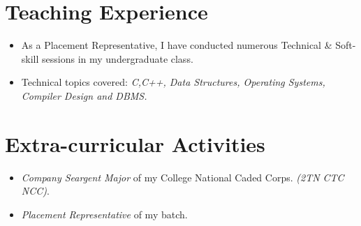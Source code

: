 \documentclass{resume}
\begin{document}
\section{Teaching Experience}
  \begin{itemize}[label={$\ast$}]
    \item As a Placement Representative, I have conducted numerous Technical \& Soft-skill sessions in my undergraduate class.
    \item Technical topics covered: \textit{C,C++, Data Structures, Operating Systems, Compiler Design and DBMS.}
  \end{itemize}

\section{Extra-curricular Activities}
  \begin{itemize}[label={$\ast$}]
    \item \textit{Company Seargent Major} of my College National Caded Corps. \textit{(2TN CTC NCC)}.
    \item \textit{Placement Representative} of my batch.
  \end{itemize}
\end{document}
